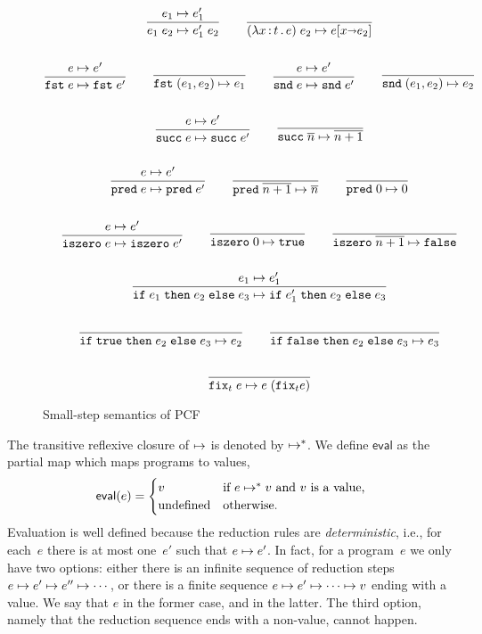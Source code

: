 \begin{figure}[htpb]
  \centering
\begin{gather*}
  \begin{gathered}\dfrac{e_1 \mapsto e_1'}{e_1 \; e_2 \mapsto e_1'\; e_2}\end{gathered}
  \qquad
  \dfrac{}{(\lambda x \,{:}\, t\,.\,e)\;e_2 \mapsto e[x {\shortrightarrow} e_2]}
  \\ \\
  \begin{gathered}\dfrac{e \mapsto e'}{\mathtt{fst}\;e \mapsto \mathtt{fst}\;e'}\end{gathered}
  \qquad
  \dfrac{}{\mathtt{fst}\;(e_1, e_2) \mapsto e_1}
  \qquad
  \begin{gathered}\dfrac{e \mapsto e'}{\mathtt{snd}\;e \mapsto \mathtt{snd}\;e'}\end{gathered}
  \qquad
  \dfrac{}{\mathtt{snd}\;(e_1, e_2) \mapsto e_2}
  \\ \\
  \begin{gathered}\dfrac{e \mapsto e'}{\mathtt{succ}\;e \mapsto \mathtt{succ}\;e'}\end{gathered}
  \qquad
  \dfrac{}{\mathtt{succ}\;\overline{n} \mapsto \overline{n+1}}
  \\ \\
  \begin{gathered}\dfrac{e \mapsto e'}{\mathtt{pred}\;e \mapsto \mathtt{pred}\;e'}\end{gathered}
  \qquad
  \dfrac{}{\mathtt{pred}\;\overline{n+1} \mapsto \overline{n}}
  \qquad
  \dfrac{}{\mathtt{pred}\;0 \mapsto 0}
  \\ \\
  \begin{gathered}\dfrac{e \mapsto e'}{\mathtt{iszero}\;e \mapsto \mathtt{iszero}\;e'}\end{gathered}
  \qquad
  \dfrac{}{\mathtt{iszero}\;0 \mapsto \mathtt{true}}
  \qquad
  \dfrac{}{\mathtt{iszero}\;\overline{n+1} \mapsto \mathtt{false}}
  \\ \\
  \begin{gathered}\dfrac{e_1 \mapsto e_1'}{\mathtt{if}\;e_1\;\mathtt{then}\;e_2\;\mathtt{else}\;e_3 \mapsto \mathtt{if}\;e_1'\;\mathtt{then}\;e_2\;\mathtt{else}\;e_3}\end{gathered}
  \\ \\
  \dfrac{}{\mathtt{if}\;\mathtt{true}\;\mathtt{then}\;e_2\;\mathtt{else}\;e_3 \mapsto e_2}
  \qquad
  \dfrac{}{\mathtt{if}\;\mathtt{false}\;\mathtt{then}\;e_2\;\mathtt{else}\;e_3 \mapsto e_3}
  \\ \\
  \dfrac{}{\mathtt{fix}_t\;e \mapsto e\;(\mathtt{fix}_t e)}
\end{gather*}
  \caption{Small-step semantics of PCF}
  \label{fig:pcf}
\end{figure}

The transitive reflexive closure of $\mapsto$ is denoted by $\mapsto^{*}$.
We define  $\mathsf{eval}$ as the partial map which
maps programs to values,
%
\begin{equation*}
  \mathsf{eval}(e) =
  \begin{cases}
    v & \text{if $e \mapsto^{*} v$ and $v$ is a value,}\\
    \text{undefined} & \text{otherwise.}
  \end{cases}
\end{equation*}
%
Evaluation is well defined because the reduction rules are
\emph{deterministic}, i.e., for each~$e$ there is at most one~$e'$
such that $e \mapsto e'$. In fact, for a program~$e$ we only have two
options: either there is an infinite sequence of reduction steps $e
\mapsto e' \mapsto e'' \mapsto \cdots$, or there is a finite sequence $e
\mapsto e' \mapsto \cdots \mapsto v$ ending with a value. We say that $e$
 in the former case, and  in the
latter. The third option, namely that the reduction sequence ends with
a non-value, cannot happen.

